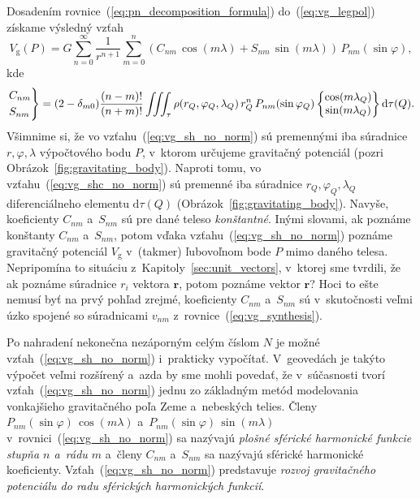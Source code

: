 \documentclass[a4paper,12pt]{book}
\newcommand{\diff}{\mathrm d}
\newcommand{\gidx}{\mathrm g}
\let\vec\mathbf
\begin{document}
Dosadením rovnice~(\ref{eq:pn_decomposition_formula}) do~(\ref{eq:vg_legpol})
získame výsledný vzťah
%
\begin{equation}
\label{eq:vg_sh_no_norm}
V_\gidx(P) = G \sum_{n = 0}^\infty \frac{1}{r^{n + 1}} \sum_{m = 0}^{n} \left(
C_{nm} \, \cos(m\lambda) + S_{nm} \, \sin(m\lambda)\right) \,
P_{nm}(\sin\varphi){,}
\end{equation}
%
kde
%
\begin{equation}
\label{eq:vg_shc_no_norm}
\begin{rcases}
C_{nm}\\
S_{nm}
\end{rcases}
= (2 - \delta_{m0}) \frac{(n - m)!}{(n + m)!} \iiint_{\tau} \rho(r_Q,
\varphi_Q, \lambda_Q) \, r_Q^n \, P_{nm}(\sin\varphi_Q)
%
\begin{Bmatrix}
\cos(m\lambda_Q)\\
\sin(m\lambda_Q)
\end{Bmatrix}
%
\diff\tau(Q){.}
\end{equation}
%
Všimnime si, že vo vzťahu~(\ref{eq:vg_sh_no_norm}) sú premennými iba súradnice
$r, \varphi, \lambda$ výpočtového bodu $P$, v~ktorom určujeme gravitačný
potenciál (pozri Obrázok~\ref{fig:gravitating_body}).  Naproti tomu, vo
vzťahu~(\ref{eq:vg_shc_no_norm}) sú premenné iba súradnice $r_Q,\varphi_Q,
\lambda_Q$ diferenciálneho elementu $\diff\tau(Q)$
(Obrázok~\ref{fig:gravitating_body}).  Navyše, koeficienty $C_{nm}$ a~$S_{nm}$
sú pre dané teleso \emph{konštantné}.  Inými slovami, ak poznáme konštanty
$C_{nm}$ a~$S_{nm}$, potom vďaka vzťahu~(\ref{eq:vg_sh_no_norm}) poznáme
gravitačný potenciál $V_\gidx$ v~(takmer) ľubovoľnom bode $P$ mimo daného
telesa.  Nepripomína to situáciu z~Kapitoly~\ref{sec:unit_vectors}, v~ktorej
sme tvrdili, že ak poznáme súradnice $r_i$ vektora $\vec r$, potom poznáme
vektor $\vec r$?  Hoci to ešte nemusí byť na prvý pohľad zrejmé, koeficienty
$C_{nm}$ a~$S_{nm}$ sú v~skutočnosti veľmi úzko spojené so súradnicami $v_{nm}$
z~rovnice~(\ref{eq:vg_synthesis}).

Po nahradení nekonečna nezáporným celým číslom $N$ je možné
vzťah~(\ref{eq:vg_sh_no_norm}) i~prakticky vypočítať.  V~geovedách je takýto
výpočet veľmi rozšírený a~azda by sme mohli povedať, že v~súčasnosti tvorí
vzťah~(\ref{eq:vg_sh_no_norm}) jednu zo základným metód modelovania vonkajšieho
gravitačného poľa Zeme a~nebeských telies.  Členy $P_{nm}(\sin\varphi) \,
\cos(m\lambda)$ a~$ P_{nm}(\sin\varphi) \, \sin(m\lambda)$
v~rovnici~(\ref{eq:vg_sh_no_norm}) sa nazývajú \emph{plošné sférické harmonické
funkcie stupňa $n$ a~rádu $m$} a~členy $C_{nm}$ a~$S_{nm}$ sa nazývajú sférické
harmonické koeficienty.  Vzťah~(\ref{eq:vg_sh_no_norm}) predstavuje
\emph{rozvoj gravitačného potenciálu do radu sférických harmonických funkcií}.
\end{document}
